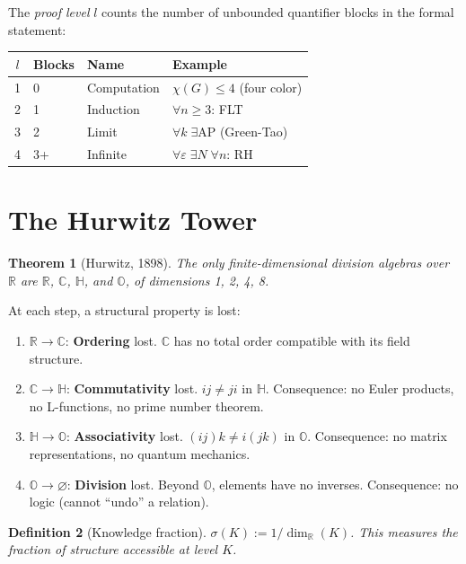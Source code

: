 \documentclass[12pt]{article}
\newtheorem{theorem}{Theorem}[section]
\newtheorem{definition}[theorem]{Definition}
\theoremstyle{remark}
\newcommand{\CC}{\mathbb{C}}
\newcommand{\RR}{\mathbb{R}}
\newcommand{\HH}{\mathbb{H}}
\newcommand{\OO}{\mathbb{O}}
\begin{document}
The \emph{proof level} $l$ counts the number of
unbounded quantifier blocks in the formal statement:

\begin{center}
\begin{tabular}{clll}
\toprule
$l$ & Blocks & Name & Example \\
\midrule
1 & 0 & Computation & $\chi(G) \le 4$ (four color) \\
2 & 1 & Induction & $\forall n \ge 3$: FLT \\
3 & 2 & Limit & $\forall k\;\exists\text{AP}$ (Green-Tao) \\
4 & 3+ & Infinite & $\forall\varepsilon\;\exists N\;\forall n$: RH \\
\bottomrule
\end{tabular}
\end{center}

\section{The Hurwitz Tower}

\begin{theorem}[Hurwitz, 1898]
The only finite-dimensional division algebras over $\RR$
are $\RR$, $\CC$, $\HH$, and $\OO$, of dimensions 1, 2, 4, 8.
\end{theorem}

At each step, a structural property is lost:

\begin{enumerate}
\item $\RR \to \CC$: \textbf{Ordering} lost.
  $\CC$ has no total order compatible with its field structure.
\item $\CC \to \HH$: \textbf{Commutativity} lost.
  $ij \ne ji$ in $\HH$. Consequence: no Euler products,
  no L-functions, no prime number theorem.
\item $\HH \to \OO$: \textbf{Associativity} lost.
  $(ij)k \ne i(jk)$ in $\OO$. Consequence: no matrix
  representations, no quantum mechanics.
\item $\OO \to \varnothing$: \textbf{Division} lost.
  Beyond $\OO$, elements have no inverses.
  Consequence: no logic (cannot ``undo'' a relation).
\end{enumerate}

\begin{definition}[Knowledge fraction]
$\sigma(K) := 1/\dim_\RR(K)$. This measures the fraction
of structure accessible at level $K$.
\end{definition}
\end{document}
